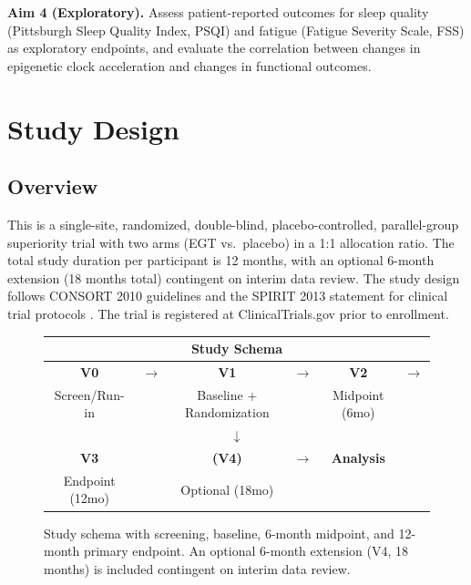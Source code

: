 \documentclass[11pt,a4paper]{article}
\begin{document}
\textbf{Aim 4 (Exploratory).} Assess patient-reported outcomes for sleep quality (Pittsburgh Sleep Quality Index, PSQI) and fatigue (Fatigue Severity Scale, FSS) as exploratory endpoints, and evaluate the correlation between changes in epigenetic clock acceleration and changes in functional outcomes.

\section{Study Design}

\subsection{Overview}

This is a single-site, randomized, double-blind, placebo-controlled, parallel-group superiority trial with two arms (EGT vs.~placebo) in a 1:1 allocation ratio. The total study duration per participant is 12 months, with an optional 6-month extension (18 months total) contingent on interim data review. The study design follows CONSORT 2010 guidelines \cite{consort2010} and the SPIRIT 2013 statement for clinical trial protocols \cite{spirit2013}. The trial is registered at ClinicalTrials.gov prior to enrollment.

\begin{figure}[H]
\centering
\begin{tabular}{|c|c|c|c|c|c|}
\hline
\multicolumn{6}{|c|}{\textbf{Study Schema}} \\ \hline
\textbf{V0} & $\rightarrow$ & \textbf{V1} & $\rightarrow$ & \textbf{V2} & $\rightarrow$ \\
Screen/Run-in & & Baseline + Randomization & & Midpoint (6mo) & \\
\hline
\multicolumn{6}{|c|}{$\downarrow$} \\ \hline
\textbf{V3} & & \textbf{(V4)} & $\rightarrow$ & \textbf{Analysis} \\
Endpoint (12mo) & & Optional (18mo) & & & \\
\hline
\end{tabular}
\caption{Study schema with screening, baseline, 6-month midpoint, and 12-month primary endpoint. An optional 6-month extension (V4, 18 months) is included contingent on interim data review.}
\end{figure}
\end{document}

